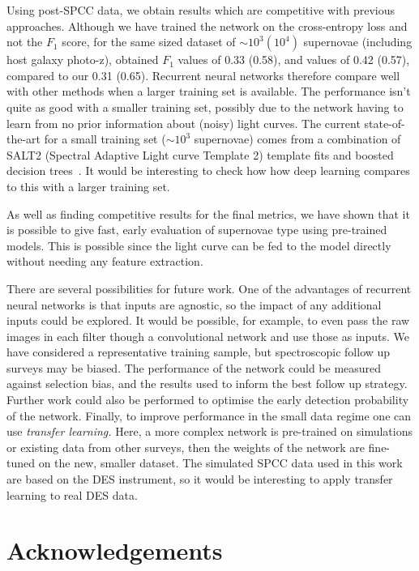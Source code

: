 \documentclass[twocolumn]{aastex61}
\begin{document}
Using post-SPCC data, we obtain results which are competitive with previous approaches.  Although we have trained the network on the cross-entropy loss and not the $F_1$ score, for the same sized dataset of $\sim10^3 (10^4)$ supernovae (including host galaxy photo-z), \cite{Karpenka:2012pm} obtained $F_1$ values of 0.33 (0.58), and \cite{Newling:2010bp} values of 0.42 (0.57), compared to our  0.31 (0.65). Recurrent neural networks  therefore compare well with other methods when a larger training  set is available. The performance isn't  quite as good with a smaller training set, possibly due to the network having to learn from no prior information about (noisy) light curves. The current state-of-the-art for a small training set ($\sim10^3$ supernovae) comes from a combination of SALT2 (Spectral Adaptive Light curve Template 2) template fits and boosted decision trees~\cite{Lochner:2016hbn}. It would be interesting to check how how deep learning compares to this with a larger training set. 

As well as finding competitive results for the final metrics, we have shown that it is possible to give fast, early evaluation of supernovae type using pre-trained models. This is possible since the light curve can be fed to the model directly without needing any feature extraction.  

There are several possibilities for future work. One of the advantages of recurrent neural networks is that inputs are agnostic, so the impact of any additional inputs could be explored. It would be possible, for example, to even pass the raw images in each filter though a convolutional network and use those as inputs. We have considered a representative training sample, but spectroscopic follow up surveys may be biased. The performance of the network could be measured against selection bias, and the results used to inform the best follow up strategy.  Further work could also be performed to optimise the early detection probability of the network.  Finally, to improve performance in the small data regime one can use {\em transfer learning.} Here, a more complex network is pre-trained on simulations or existing data from other surveys, then the weights of the network are fine-tuned on the new, smaller dataset. The simulated SPCC data used in this work are based on the DES instrument, so it would be interesting to apply transfer learning to real DES data. 

\section*{Acknowledgements}
\end{document}
